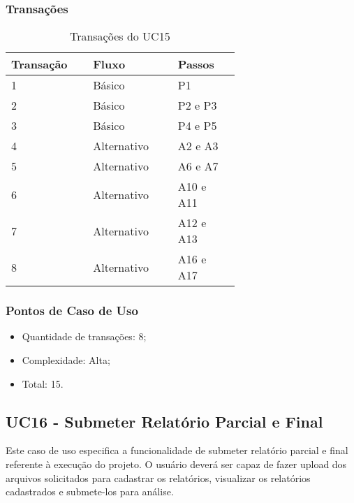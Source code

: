   \subsubsection{Transações}

  \begin{table*}[!h]
  \centering
  \caption{Transações do UC15}
  \label{uc15_transactions}
    \begin{tabular}{|p{0.20\linewidth}|p{0.25\linewidth}|p{0.20\linewidth}|}
    \hline
    \textbf{Transação} & \textbf{Fluxo} & \textbf{Passos} \\ 
    \hline
    1 & Básico & P1\\
    \hline
    2 & Básico & P2 e P3\\
    \hline
    3 & Básico & P4 e P5\\
    \hline
    4 & Alternativo & A2 e A3\\
    \hline
    5 & Alternativo & A6 e A7\\
    \hline
    6 & Alternativo & A10 e A11\\
    \hline
    7 & Alternativo & A12 e A13\\
    \hline
    8 & Alternativo & A16 e A17\\
    \hline
    \end{tabular}
  \end{table*}

  \subsubsection{Pontos de Caso de Uso}

  \begin{itemize}
  \item Quantidade de transações: 8;
  \item Complexidade: Alta;
  \item Total: 15.
  \end{itemize}

  \vfill
  
\pagebreak
\subsection{UC16 - Submeter Relatório Parcial e Final}
  
  Este caso de uso especifica a funcionalidade de submeter relatório parcial e final referente à execução do projeto.
  O usuário deverá ser capaz de fazer upload dos arquivos solicitados para cadastrar os relatórios, visualizar os
  relatórios cadastrados e submete-los para análise.
  
